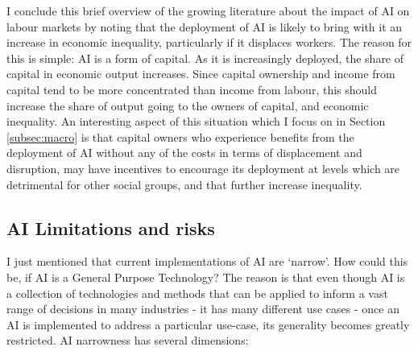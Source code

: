 \documentclass[11pt]{article}
\begin{document}
I conclude this brief overview of the growing literature about the impact of AI on labour markets by noting that the deployment of AI  is likely to bring with it an increase in economic inequality, particularly if it displaces workers. The reason for this is simple: AI is a form of capital. As it is increasingly deployed, the share of capital in economic output increases. Since capital ownership and income from capital tend to be more concentrated than income from labour, this should increase the share of output going to the owners of capital, and economic inequality. An interesting aspect of this situation which I focus on in Section \ref{subsec:macro} is that capital owners who experience benefits from the deployment of AI without any of the costs in terms of displacement and disruption, may have incentives to encourage its deployment at levels which are detrimental for other social groups, and that further increase inequality.

\subsection{AI Limitations and risks}
\label{subsec:limits}
I just mentioned that current implementations of AI are  `narrow'. How could this be, if AI is a General Purpose Technology? The reason is that even though AI is a collection of technologies and methods that can be applied to inform a vast range of decisions in many industries - it has many different use cases - once an AI is implemented to address a particular use-case, its generality becomes greatly restricted. AI narrowness has several dimensions:
\end{document}
